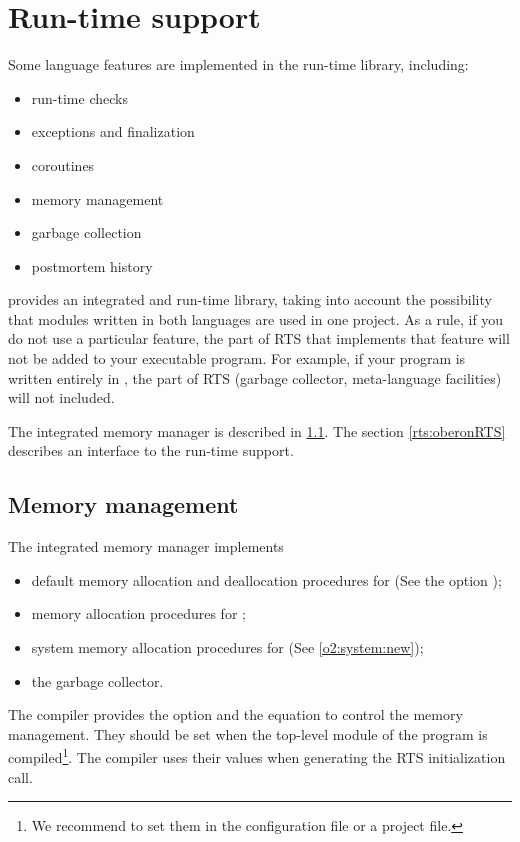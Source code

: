 \chapter{Run-time support}\label{rts}

Some language features are implemented in the run-time library,
including:
\begin{itemize}
\ifgenc
\item   run-time checks
\fi
\item   exceptions and finalization
\item   coroutines
\item   memory management
\item   garbage collection
\item   postmortem history
\end{itemize}
\xds{} provides an integrated \mt{} and \ot{} run-time library, taking
into account the possibility that modules written in both languages are
used in one project. As a rule, if you do not use a particular feature,
the part of RTS that implements that feature will not be added to your
executable program. For example, if your program is written entirely
in \mt{}, the \ot{} part of RTS (garbage collector, meta-language
facilities) will not included.

The integrated memory manager is described
in \ref{rts:mm}. The section \ref{rts:oberonRTS} describes
an interface to the \ot{} run-time support.

\section{Memory management}\label{rts:mm}

The \xds{} integrated memory manager implements
\begin{itemize}
\item   default memory allocation and deallocation procedures for \mt{}
        (See the option );
\item   memory allocation procedures for \ot{};
\item   system memory allocation procedures for \ot{}
        (See \ref{o2:system:new});
\item   the garbage collector.
\end{itemize}

The compiler provides the option  and the equation
 to control the memory management. They should be set
when the top-level module of the program is compiled\footnote{
We recommend to set them in the configuration file or a project file.}.
The compiler uses their values when generating
the RTS initialization call.

